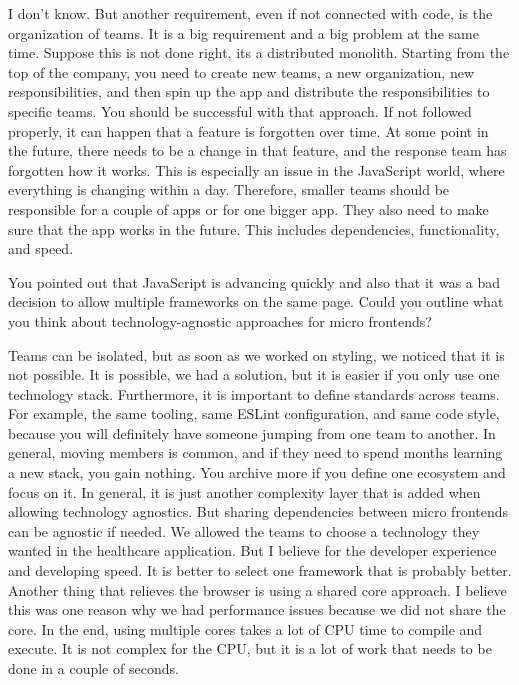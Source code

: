 \begin{description}
    \IvanJovanovic I don't know. But another requirement, even if not connected with code, is the organization of teams. It is a big requirement and a big problem at the same time. Suppose this is not done right, its a distributed monolith. Starting from the top of the company, you need to create new teams, a new organization, new responsibilities, and then spin up the app and distribute the responsibilities to specific teams. You should be successful with that approach. If not followed properly, it can happen that a feature is forgotten over time. At some point in the future, there needs to be a change in that feature, and the response team has forgotten how it works. This is especially an issue in the JavaScript world, where everything is changing within a day.
    Therefore, smaller teams should be responsible for a couple of apps or for one bigger app. They also need to make sure that the app works in the future. This includes dependencies, functionality, and speed.


    \NicoVogel You pointed out that JavaScript is advancing quickly and also that it was a bad decision to allow multiple frameworks on the same page. Could you outline what you think about technology-agnostic approaches for micro frontends?


    \IvanJovanovic Teams can be isolated, but as soon as we worked on styling, we noticed that it is not possible. It is possible, we had a solution, but it is easier if you only use one technology stack. Furthermore, it is important to define standards across teams. For example, the same tooling, same ESLint configuration, and same code style, because you will definitely have someone jumping from one team to another. In general, moving members is common, and if they need to spend months learning a new stack, you gain nothing. You archive more if you define one ecosystem and focus on it. In general, it is just another complexity layer that is added when allowing technology agnostics.
    But sharing dependencies between micro frontends can be agnostic if needed.
    We allowed the teams to choose a technology they wanted in the healthcare application. But I believe for the developer experience and developing speed. It is better to select one framework that is probably better.
    Another thing that relieves the browser is using a shared core approach. I believe this was one reason why we had performance issues because we did not share the core. In the end, using multiple cores takes a lot of CPU time to compile and execute. It is not complex for the CPU, but it is a lot of work that needs to be done in a couple of seconds.



\end{description}
